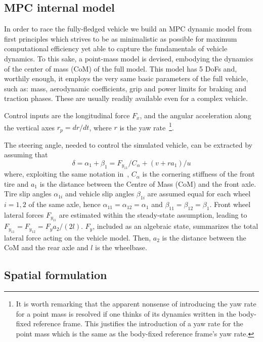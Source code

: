 \documentclass[conference]{IEEEtran} %
\begin{document}
\subsection{MPC internal model}

In order to race the fully-fledged vehicle we build an MPC dynamic model from first principles which strives to be as minimalistic as possible for maximum computational efficiency yet able to capture the fundamentals of vehicle dynamics. To this sake, a point-mass model is devised, embodying the dynamics of the center of mass (CoM) of the full model.
This model has 5 DoFs and, worthily enough, it employs the very same basic parameters of the full vehicle, such as: mass, aerodynamic coefficients, grip and power limits for braking and traction phases. These are usually readily available even for a complex vehicle.

Control inputs are the longitudinal force $F_{x}$, and the angular acceleration along the vertical axes $r_p = dr/dt$, where $r$ is the yaw rate~\footnote{It is worth remarking that the apparent nonsense of introducing the yaw rate for a point mass is resolved if one thinks of its dynamics written in the body-fixed reference frame. This justifies the introduction of a yaw rate for the point mass which is the same as the body-fixed reference frame's yaw rate.}.

The steering angle, needed to control the simulated vehicle, can be extracted by assuming that
\begin{equation}
\delta = \alpha_{1} + \beta_1 = F_{y_{11}}/C_\alpha + (v + ra_1)/u
\end{equation}
where, exploiting the same notation in~\cite{Guiggiani2018}, $C_\alpha$ is the cornering stiffness of the front tire and $a_1$ is the distance between the Centre of Mass (CoM) and the front axle.
Tire slip angles $\alpha_{1i}$ and vehicle slip angles $\beta_{1i}$ are assumed equal for each wheel $i=1, 2$ of the same axle, hence $\alpha_{11} = \alpha_{12} = \alpha_{1}$ and $\beta_{11} = \beta_{12} = \beta_{1}$.
%
Front wheel lateral forces $F_{y_{1i}}$ are estimated within the steady-state assumption, leading to $F_{y_{11}} = F_{y_{12}} = F_{y}a_2/(2l)$.
$F_{y}$, included as an algebraic state, summarizes the total lateral force acting on the vehicle model. Then, $a_2$ is the distance between the CoM and the rear axle and $l$ is the wheelbase.

\subsection{Spatial formulation}
\end{document}
